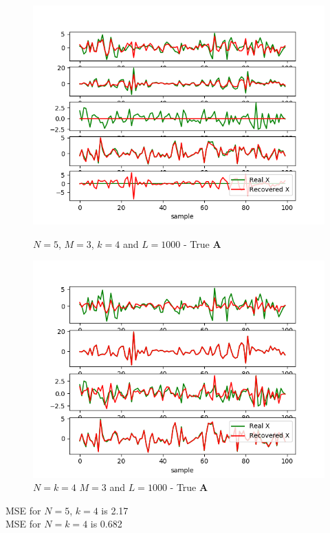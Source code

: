 \begin{figure}[H]
    \begin{minipage}[t]{.45\textwidth}
    	\centering
		\includegraphics[scale=0.5]{figures/ch_6/M-SBL_AR1.png}
		\caption{ $N=5$, $M = 3$, $k=4$ and $L=1000$  - True $\textbf{A}$}
		\label{fig:AR1}
    \end{minipage} 
    \hfill
    \begin{minipage}[t]{.45\textwidth}
        \centering
		\includegraphics[scale=0.5]{figures/ch_6/M-SBL_AR2.png}
		\caption{$N=k=4$ $M = 3$ and $L=1000$ - True $\textbf{A}$}
		\label{fig:AR2}
    \end{minipage}
\end{figure}


MSE for $N=5$, $k=4$ is 2.17\\
MSE for $N=k=4$ is 0.682\\


 

